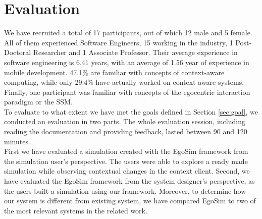 \chapter{Evaluation}\label{ch:evaluation}
We have recruited a total of 17 participants, out of which 12 male and 5 female. All of them experienced Software Engineers, 15 working in the industry, 1 Post-Doctoral Researcher and 1 Associate Professor. Their average experience in software engineering is 6.41 years, with an average of 1.56 year of experience in mobile development. 47.1\% are familiar with concepts of context-aware computing, while only 29.4\% have actually worked on context-aware systems. Finally, one participant was familiar with concepts of the egocentric interaction paradigm or the SSM.\\

To evaluate to what extent we have met the goals defined in Section \ref{sec:goal}, we conducted an evaluation in two parts. The whole evaluation session, including reading the documentation and providing feedback, lasted between 90 and 120 minutes.\\

First we have evaluated a simulation created with the EgoSim framework from the simulation user's perspective. The users were able to explore a ready made simulation while observing contextual changes in the context client. Second, we have evaluated the EgoSim framework from the system designer's perspective, as the users built a simulation using our framework. Moreover, to determine how our system is different from existing system, we have compared EgoSim to two of the most relevant systems in the related work.\\






